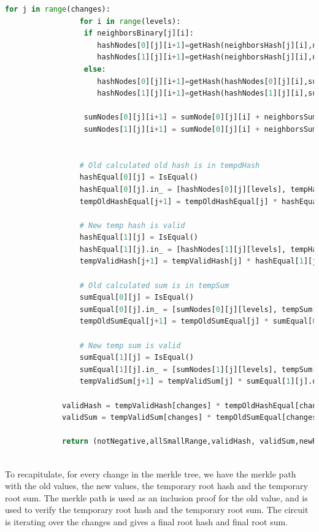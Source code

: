 \begin{lstlisting}[language=Python, caption=Liabilities change circuit pseudocode]
             for j in range(changes):
                 for i in range(levels):
                  if neighborsBinary[j][i]:
                     hashNodes[0][j][i+1]=getHash(neighborsHash[j][i],neighborsSum[j][i],hashNodes[0][j][i],sumNode[0][j][i])
                     hashNodes[1][j][i+1]=getHash(neighborsHash[j][i],neighborsSum[j][i],hashNodes[1][j][i],sumNode[1][j][i])
                  else:
                     hashNodes[0][j][i+1]=getHash(hashNodes[0][j][i],sumNode[0][j][i],neighborsHash[j][i],neighborsSum[j][i])
                     hashNodes[1][j][i+1]=getHash(hashNodes[1][j][i],sumNode[1][j][i],neighborsHash[j][i],neighborsSum[j][i])

                  sumNodes[0][j][i+1] = sumNode[0][j][i] + neighborsSum[j][i]
                  sumNodes[1][j][i+1] = sumNode[0][j][i] + neighborsSum[j][i]
                     
         
                 # Old calculated old hash is in tempdHash
                 hashEqual[0][j] = IsEqual()
                 hashEqual[0][j].in_ = [hashNodes[0][j][levels], tempHash[j]].out
                 tempOldHashEqual[j+1] = tempOldHashEqual[j] * hashEqual[0][j].out
         
                 # New temp hash is valid
                 hashEqual[1][j] = IsEqual()
                 hashEqual[1][j].in_ = [hashNodes[1][j][levels], tempHash[j+1]].out
                 tempValidHash[j+1] = tempValidHash[j] * hashEqual[1][j].out
         
                 # Old calculated sum is in tempSum
                 sumEqual[0][j] = IsEqual()
                 sumEqual[0][j].in_ = [sumNodes[0][j][levels], tempSum[j]].out
                 tempOldSumEqual[j+1] = tempOldSumEqual[j] * sumEqual[0][j].out
                 
                 # New temp sum is valid
                 sumEqual[1][j] = IsEqual()
                 sumEqual[1][j].in_ = [sumNodes[1][j][levels], tempSum[j+1]].out
                 tempValidSum[j+1] = tempValidSum[j] * sumEqual[1][j].out
         
             validHash = tempValidHash[changes] * tempOldHashEqual[changes]
             validSum = tempValidSum[changes] * tempOldSumEqual[changes]
         
             return (notNegative,allSmallRange,validHash, validSum,newRootHash,newSum)
         
      \end{lstlisting}

To recapitulate, for every change in the merkle tree, we have the merkle path with the old values, the new values, the temporary root hash and
the temporary root sum.
The merkle path is used as an inclusion proof for the old value, and is used to verify the temporary root hash and the temporary root sum.
The circuit is iterating over the changes and gives a final root hash and final root sum.

